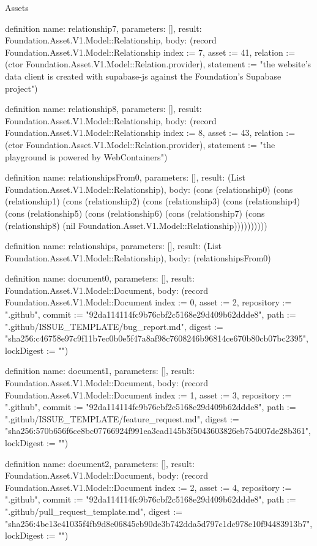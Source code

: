 \begin{lexlean}{Assets}
\begin{semanticmodule}
definition{
  name: relationship7,
  parameters: [],
  result: Foundation.Asset.V1.Model::Relationship,
  body: (record Foundation.Asset.V1.Model::Relationship {index := 7, asset := 41, relation := (ctor Foundation.Asset.V1.Model::Relation.provider), statement := "the website's data client is created with supabase-js against the Foundation's Supabase project"})
}

definition{
  name: relationship8,
  parameters: [],
  result: Foundation.Asset.V1.Model::Relationship,
  body: (record Foundation.Asset.V1.Model::Relationship {index := 8, asset := 43, relation := (ctor Foundation.Asset.V1.Model::Relation.provider), statement := "the playground is powered by WebContainers"})
}

definition{
  name: relationshipsFrom0,
  parameters: [],
  result: (List Foundation.Asset.V1.Model::Relationship),
  body: (cons (relationship0) (cons (relationship1) (cons (relationship2) (cons (relationship3) (cons (relationship4) (cons (relationship5) (cons (relationship6) (cons (relationship7) (cons (relationship8) (nil Foundation.Asset.V1.Model::Relationship))))))))))
}

definition{
  name: relationships,
  parameters: [],
  result: (List Foundation.Asset.V1.Model::Relationship),
  body: (relationshipsFrom0)
}

definition{
  name: document0,
  parameters: [],
  result: Foundation.Asset.V1.Model::Document,
  body: (record Foundation.Asset.V1.Model::Document {index := 0, asset := 2, repository := ".github", commit := "92da114114fc9b76cbf2c5168e29d409b62ddde8", path := ".github/ISSUE_TEMPLATE/bug_report.md", digest := "sha256:c46758e97c9f11b7ec0b0e5f47a8af98c7608246b96814ce670b80cb07bc2395", lockDigest := ""})
}

definition{
  name: document1,
  parameters: [],
  result: Foundation.Asset.V1.Model::Document,
  body: (record Foundation.Asset.V1.Model::Document {index := 1, asset := 3, repository := ".github", commit := "92da114114fc9b76cbf2c5168e29d409b62ddde8", path := ".github/ISSUE_TEMPLATE/feature_request.md", digest := "sha256:570b656f6ce8bc07766924f991ea3cad145b3f5043603826eb754007de28b361", lockDigest := ""})
}

definition{
  name: document2,
  parameters: [],
  result: Foundation.Asset.V1.Model::Document,
  body: (record Foundation.Asset.V1.Model::Document {index := 2, asset := 4, repository := ".github", commit := "92da114114fc9b76cbf2c5168e29d409b62ddde8", path := ".github/pull_request_template.md", digest := "sha256:4be13e41035f4fb9d8e06845cb90de3b742dda5d797c1dc978e10f94483913b7", lockDigest := ""})
}


\end{semanticmodule}
\end{lexlean}
